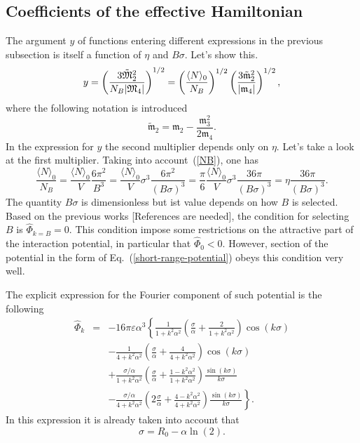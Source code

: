 \subsection{Coefficients of the effective Hamiltonian}
The argument $y$ of functions entering different expressions in the previous subsection is itself a function of $\eta$ and $B\sigma$. Let's show this.
\begin{equation}
	y=\left(\frac{3\tilde{\mathfrak{M}}_2^2}{N_B \abs{\mathfrak{M}_4}}\right)^{1/2} = \left(\frac{\langle N \rangle_0}{N_B}\right)^{1/2} \left(\frac{3\tilde{\mathfrak{m}}_2^2}{\abs{\mathfrak{m}_4}}\right)^{1/2},
\end{equation}
where the following notation is introduced
\begin{equation}
	\tilde{\mathfrak{m}}_2 = \mathfrak{m}_2 - \frac{\mathfrak{m}_3^2}{2\mathfrak{m}_4}.
\end{equation}
In the expression for $y$ the second multiplier depends only on $\eta$. Let's take a look at the first multiplier. Taking into account~(\ref{NB}), one has
\begin{equation}
	\frac{\langle N \rangle_0}{N_B} = \frac{\langle N \rangle_0}{V} \frac{6\pi^2}{B^3} = \frac{\langle N \rangle_0}{V}\sigma^3 \frac{6\pi^2}{(B\sigma)^3} = \frac{\pi}{6}\frac{\langle N \rangle_0}{V}\sigma^3 \frac{36\pi}{(B\sigma)^3} = \eta \frac{36\pi}{(B\sigma)^3}.
\end{equation}
The quantity $B\sigma$ is dimensionless but ist value depends on how $B$ is selected. Based on the previous works [References are needed], the condition for selecting $B$ is $\hat{\Phi}_{k=B} = 0.$ This condition impose some restrictions on the attractive part of the interaction potential, in particular that $\hat{\Phi}_0 < 0.$ However, section of the potential in the form of Eq.~(\ref{short-range-potential}) obeys this condition very well. 

The explicit expression for the Fourier component of such potential is the following
\begin{eqnarray}
	\hat{\Phi}_k &=& -16\pi \varepsilon \alpha^3 
	\left\{
		\frac{1}{1+k^2\alpha^2}\left(\frac{\sigma}{\alpha} + \frac{2}{1+k^2\alpha^2}\right) \cos(k\sigma)
	\right.
	\nonumber\\
	&& \left.
	 -\frac{1}{4 + k^2\alpha^2} \left(\frac{\sigma}{\alpha} + \frac{4}{4 + k^2\alpha^2}\right) \cos(k\sigma)
	 \right.
	 \nonumber \\
	&& \left.
	+ \frac{\sigma/\alpha}{1 + k^2\alpha^2} \left(\frac{\sigma}{\alpha} + \frac{1 - k^2\alpha^2}{1 + k^2 \alpha^2}\right) \frac{\sin(k\sigma)}{k\sigma}
	\right.
	\nonumber\\
	&& \left.
	- \frac{\sigma/\alpha}{4 + k^2\alpha^2} \left(2\frac{\sigma}{\alpha} + \frac{4 - k^2\alpha^2}{4 + k^2\alpha^2}\right) \frac{\sin(k\sigma)}{k\sigma}
	\right\}.
\end{eqnarray}
In this expression it is already taken into account that
\begin{equation}
	\sigma = R_0 - \alpha\ln(2).
\end{equation}

